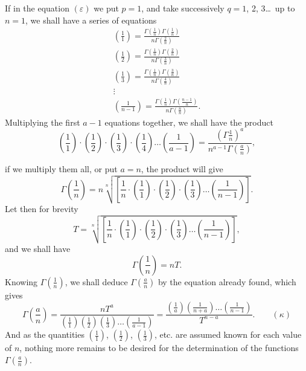 \documentclass{article}
\begin{document}
If in the equation $(\varepsilon)$ we put $p=1$, and take successively $q=1$, 2, 3\ldots\ up to $n=1$, we shall have a series of equations
\[ \begin{gathered} \left(\frac{1}{1}\right)=\frac{\Gamma\left(\frac{1}{n}\right)\Gamma\left(\frac{1}{n}\right)}{n\Gamma\left(\frac{2}{n}\right)}\\ \left(\frac{1}{2}\right)=\frac{\Gamma\left(\frac{1}{n}\right)\Gamma\left(\frac{2}{n}\right)}{n\Gamma\left(\frac{3}{n}\right)}\\ \left(\frac{1}{3}\right)=\frac{\Gamma\left(\frac{1}{n}\right)\Gamma\left(\frac{3}{n}\right)}{n\Gamma\left(\frac{4}{n}\right)}\\ \vdots\\ \left(\frac{1}{n-1}\right)=\frac{\Gamma\left(\frac{1}{n}\right)\Gamma\left(\frac{n-1}{n}\right)}{n\Gamma\left(\frac{n}{n}\right)}. \end{gathered} \]
Multiplying the first $a-1$ equations together, we shall have the product
\[ \left(\frac{1}{1}\right)\cdot\left(\frac{1}{2}\right)\cdot\left(\frac{1}{3}\right)\cdot\left(\frac{1}{4}\right)\ldots\left(\frac{1}{a-1}\right)=\frac{\left(\Gamma\frac{1}{n}\right)^{a}}{n^{a-1}\Gamma\left(\frac{a}{n}\right)}, \]

if we multiply them all, or put $a=n$, the product will give
\[ \Gamma\left(\frac{1}{n}\right)=n\sqrt[n]{\left[\frac{1}{n}\cdot\left(\frac{1}{1}\right)\cdot\left(\frac{1}{2}\right)\cdot\left(\frac{1}{3}\right)\ldots\left(\frac{1}{n-1}\right)\right]}. \]
Let then for brevity
\[ T=\sqrt[n]{\left[\frac{1}{n}\cdot\left(\frac{1}{1}\right)\cdot\left(\frac{1}{2}\right)\cdot\left(\frac{1}{3}\right)\ldots\left(\frac{1}{n-1}\right)\right]}, \]
and we shall have
\[ \Gamma\left(\frac{1}{n}\right)=nT. \]
Knowing $\Gamma\left(\frac{1}{n}\right)$, we shall deduce $\Gamma\left(\frac{a}{n}\right)$ by the equation already found, which gives
\[ \Gamma\left(\frac{a}{n}\right)=\frac{nT^{a}}{\left(\frac{1}{1}\right)\left(\frac{1}{2}\right)\left(\frac{1}{3}\right)\ldots\left(\frac{1}{a-1}\right)}=\frac{\left(\frac{1}{a}\right)\left(\frac{1}{n+a}\right)\ldots\left(\frac{1}{n-1}\right)}{T^{n-a}}.\qquad(\kappa) \]
And as the quantities $\left(\frac{1}{1}\right)$, $\left(\frac{1}{2}\right)$, $\left(\frac{1}{3}\right)$, etc. are assumed known for each value of $n$, nothing more remains to be desired for the determination of the functions $\Gamma\left(\frac{a}{n}\right)$.
\end{document}
